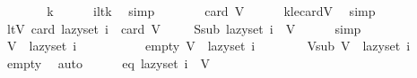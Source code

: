 \begin{isabellebody}
\ \ \isamarkupfalse%
\ \isamarkupfalse%
\ {\isachardoublequoteopen}{\isachardot}{\kern0pt}{\isachardot}{\kern0pt}{\isachardot}{\kern0pt}\ {\isacharless}{\kern0pt}\ k{\isachardoublequoteclose}\isanewline
\ \ \ \ \isamarkupfalse%
\ i{\isacharunderscore}{\kern0pt}lt{\isacharunderscore}{\kern0pt}k\ \isamarkupfalse%
\ simp\isanewline
\ \ \isamarkupfalse%
\ \isamarkupfalse%
\ {\isachardoublequoteopen}{\isachardot}{\kern0pt}{\isachardot}{\kern0pt}{\isachardot}{\kern0pt}\ {\isasymle}\ card\ V{\isachardoublequoteclose}\isanewline
\ \ \ \ \isamarkupfalse%
\ k{\isacharunderscore}{\kern0pt}le{\isacharunderscore}{\kern0pt}cardV\ \isamarkupfalse%
\ simp\isanewline
\ \ \isamarkupfalse%
\ \isamarkupfalse%
\ ltV{\isacharcolon}{\kern0pt}\ {\isachardoublequoteopen}card\ {\isacharparenleft}{\kern0pt}lazy{\isacharunderscore}{\kern0pt}set\ i{\isacharparenright}{\kern0pt}\ {\isacharless}{\kern0pt}\ card\ V{\isachardoublequoteclose}\ \isakeywordONE{{\isachardot}{\kern0pt}}\isamarkupfalse%
\isanewline
\isanewline
\ \ \isamarkupfalse%
\ S{\isacharunderscore}{\kern0pt}sub{\isacharcolon}{\kern0pt}\ {\isachardoublequoteopen}lazy{\isacharunderscore}{\kern0pt}set\ i\ {\isasymsubseteq}\ V{\isachardoublequoteclose}\isanewline
\ \ \ \ \isamarkupfalse%
\ simp\isanewline
\isanewline
\ \ \isamarkupfalse%
\ {\isachardoublequoteopen}V\ {\isacharminus}{\kern0pt}\ lazy{\isacharunderscore}{\kern0pt}set\ i\ {\isasymnoteq}\ {\isacharbraceleft}{\kern0pt}{\isacharbraceright}{\kern0pt}{\isachardoublequoteclose}\isanewline
\ \ \isamarkupfalse%
\isanewline
\ \ \ \ \isamarkupfalse%
\ empty{\isacharcolon}{\kern0pt}\ {\isachardoublequoteopen}V\ {\isacharminus}{\kern0pt}\ lazy{\isacharunderscore}{\kern0pt}set\ i\ {\isacharequal}{\kern0pt}\ {\isacharbraceleft}{\kern0pt}{\isacharbraceright}{\kern0pt}{\isachardoublequoteclose}\isanewline
\ \ \ \ \isamarkupfalse%
\ V{\isacharunderscore}{\kern0pt}sub{\isacharcolon}{\kern0pt}\ {\isachardoublequoteopen}V\ {\isasymsubseteq}\ lazy{\isacharunderscore}{\kern0pt}set\ i{\isachardoublequoteclose}\isanewline
\ \ \ \ \ \ \isamarkupfalse%
\ empty\ \isamarkupfalse%
\ auto\isanewline
\ \ \ \ \isamarkupfalse%
\ eq{\isacharcolon}{\kern0pt}\ {\isachardoublequoteopen}lazy{\isacharunderscore}{\kern0pt}set\ i\ {\isacharequal}{\kern0pt}\ V{\isachardoublequoteclose}\isanewline

\end{isabellebody}

